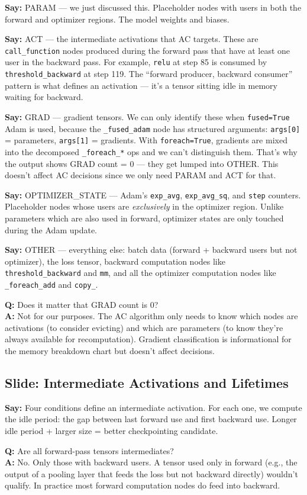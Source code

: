 \documentclass[11pt]{article}
\newcommand{\slide}[1]{\subsection*{Slide: #1}}
\newcommand{\say}[1]{\textbf{Say:} #1}
\newcommand{\qa}[2]{\textcolor{question}{\textbf{Q:} #1} \\ \textbf{A:} #2}
\begin{document}
\say{PARAM --- we just discussed this. Placeholder nodes with users in both the forward and optimizer regions. The model weights and biases.}

\say{ACT --- the intermediate activations that AC targets. These are \texttt{call\_function} nodes produced during the forward pass that have at least one user in the backward pass. For example, \texttt{relu} at step 85 is consumed by \texttt{threshold\_backward} at step 119. The ``forward producer, backward consumer'' pattern is what defines an activation --- it's a tensor sitting idle in memory waiting for backward.}

\say{GRAD --- gradient tensors. We can only identify these when \texttt{fused=True} Adam is used, because the \texttt{\_fused\_adam} node has structured arguments: \texttt{args[0]} = parameters, \texttt{args[1]} = gradients. With \texttt{foreach=True}, gradients are mixed into the decomposed \texttt{\_foreach\_*} ops and we can't distinguish them. That's why the output shows GRAD count = 0 --- they get lumped into OTHER. This doesn't affect AC decisions since we only need PARAM and ACT for that.}

\say{OPTIMIZER\_STATE --- Adam's \texttt{exp\_avg}, \texttt{exp\_avg\_sq}, and \texttt{step} counters. Placeholder nodes whose users are \emph{exclusively} in the optimizer region. Unlike parameters which are also used in forward, optimizer states are only touched during the Adam update.}

\say{OTHER --- everything else: batch data (forward + backward users but not optimizer), the loss tensor, backward computation nodes like \texttt{threshold\_backward} and \texttt{mm}, and all the optimizer computation nodes like \texttt{\_foreach\_add} and \texttt{copy\_}.}

\qa{Does it matter that GRAD count is 0?}{Not for our purposes. The AC algorithm only needs to know which nodes are activations (to consider evicting) and which are parameters (to know they're always available for recomputation). Gradient classification is informational for the memory breakdown chart but doesn't affect decisions.}

\slide{Intermediate Activations and Lifetimes}
\say{Four conditions define an intermediate activation. For each one, we compute the idle period: the gap between last forward use and first backward use. Longer idle period + larger size = better checkpointing candidate.}

\qa{Are all forward-pass tensors intermediates?}{No. Only those with backward users. A tensor used only in forward (e.g., the output of a pooling layer that feeds the loss but not backward directly) wouldn't qualify. In practice most forward computation nodes do feed into backward.}
\end{document}
